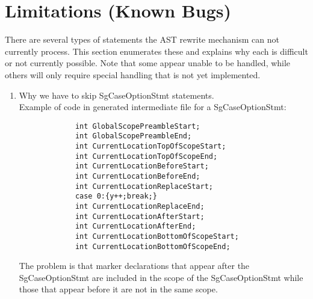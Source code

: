 \section{Limitations (Known Bugs)}

   There are several types of statements the AST rewrite mechanism can not 
currently process.  This section enumerates these and explains why each is difficult 
or not currently possible. Note that some appear unable to be handled,
while others will only require special handling that is not yet implemented.
\begin{enumerate}
     \item Why we have to skip SgCaseOptionStmt statements. \\
        Example of code in generated intermediate file for a SgCaseOptionStmt:
{\indent
{\mySmallFontSize
\begin{verbatim}
             int GlobalScopePreambleStart;
             int GlobalScopePreambleEnd;
             int CurrentLocationTopOfScopeStart;
             int CurrentLocationTopOfScopeEnd;
             int CurrentLocationBeforeStart;
             int CurrentLocationBeforeEnd;
             int CurrentLocationReplaceStart;
             case 0:{y++;break;}
             int CurrentLocationReplaceEnd;
             int CurrentLocationAfterStart;
             int CurrentLocationAfterEnd;
             int CurrentLocationBottomOfScopeStart;
             int CurrentLocationBottomOfScopeEnd;
\end{verbatim}
}}
        The problem is that marker declarations that appear after the SgCaseOptionStmt 
        are included in the scope of the SgCaseOptionStmt while those that appear 
        before it are not in the same scope.


\end{enumerate}
